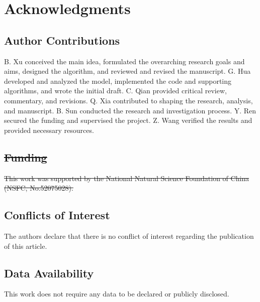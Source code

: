 \documentclass{article}
\providecommand{\DIFdel}[1]{{\protect\color{red}\sout{#1}}}                      %
\providecommand{\DIFdelbegin}{} %
\providecommand{\DIFdelend}{} %
\newcommand{\DIFscaledelfig}{0.5}
\newlength{\DIFdelgraphicswidth} %
\newlength{\DIFdelgraphicsheight} %
\newcommand{\DIFdelincludegraphics}[2][]{%
\sbox{\DIFdelgraphicsbox}{\DIFOincludegraphics[#1]{#2}}%
\settoboxwidth{\DIFdelgraphicswidth}{\DIFdelgraphicsbox} %
\settoboxtotalheight{\DIFdelgraphicsheight}{\DIFdelgraphicsbox} %
\scalebox{\DIFscaledelfig}{%
\parbox[b]{\DIFdelgraphicswidth}{\usebox{\DIFdelgraphicsbox}\\[-\baselineskip] \rule{\DIFdelgraphicswidth}{0em}}\llap{\resizebox{\DIFdelgraphicswidth}{\DIFdelgraphicsheight}{%
\setlength{\unitlength}{\DIFdelgraphicswidth}%
\begin{picture}(1,1)%
\thicklines\linethickness{2pt} %
{\color[rgb]{1,0,0}\put(0,0){\framebox(1,1){}}}%
{\color[rgb]{1,0,0}\put(0,0){\line( 1,1){1}}}%
{\color[rgb]{1,0,0}\put(0,1){\line(1,-1){1}}}%
\end{picture}%
}\hspace*{3pt}}} %
} %
\DeclareRobustCommand{\DIFdelbegin}{\DIFOdelbegin \let\includegraphics\DIFdelincludegraphics} %
\DeclareRobustCommand{\DIFdelend}{\DIFOaddend \let\includegraphics\DIFOincludegraphics} %
\begin{document}
\section*{Acknowledgments}

\subsection*{Author Contributions} 

B. Xu conceived the main idea, formulated the overarching research goals and aims, designed the algorithm, and reviewed and revised the manuscript.
G. Hua developed and analyzed the model, implemented the code and supporting algorithms, and wrote the initial draft.
C. Qian provided critical review, commentary, and revisions.
Q. Xia contributed to shaping the research, analysis, and manuscript.
B. Sun conducted the research and investigation process.
Y. Ren secured the funding and supervised the project.
Z. Wang verified the results and provided necessary resources.

\DIFdelbegin \subsection*{\DIFdel{Funding}}

\DIFdel{This work was supported by the National Natural Science Foundation of China (NSFC, No.52075028).
}\DIFdelend %

\subsection*{Conflicts of Interest}

The authors declare that there is no conflict of interest regarding the publication of this article.

\subsection*{Data Availability}

This work does not require any data to be declared or publicly disclosed.



\end{document}
